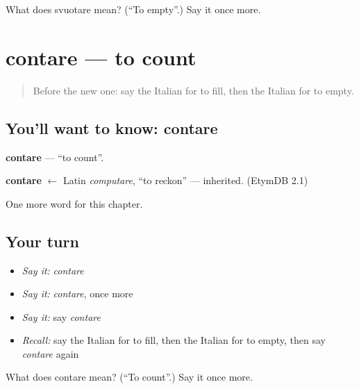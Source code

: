 \begin{tcolorbox}[breakable,colback=teal!4,colframe=teal!35!black,title={Before you move on}]
What does svuotare mean? (\textquotedblleft{}To empty\textquotedblright{}.) Say it once more.
\end{tcolorbox}
\section[contare]{contare — to count}

\label{lesson:IT-C206-contare}



\begin{quote}
Before the new one: say the Italian for to fill, then the Italian for to empty.
\end{quote}

\subsection*{You'll want to know: contare}
\textbf{contare} — \textquotedblleft{}to count\textquotedblright{}.

\begin{cousinweb}
\textbf{contare} $\leftarrow$ Latin \emph{computare}, \textquotedblleft{}to reckon\textquotedblright{} — inherited. (EtymDB 2.1)
\end{cousinweb}

\begin{grammarlens}[title={What you've built}]
One more word for this chapter.
\end{grammarlens}

\subsection*{Your turn}
\begin{itemize}
\raggedright
  \item \emph{Say it:} \emph{contare}
  \item \emph{Say it:} \emph{contare}, once more
  \item \emph{Say it:} say \emph{contare}
  \item \emph{Recall:} say the Italian for to fill, then the Italian for to empty, then say \emph{contare} again
\end{itemize}

\begin{tcolorbox}[breakable,colback=teal!4,colframe=teal!35!black,title={Before you move on}]
What does contare mean? (\textquotedblleft{}To count\textquotedblright{}.) Say it once more.
\end{tcolorbox}
